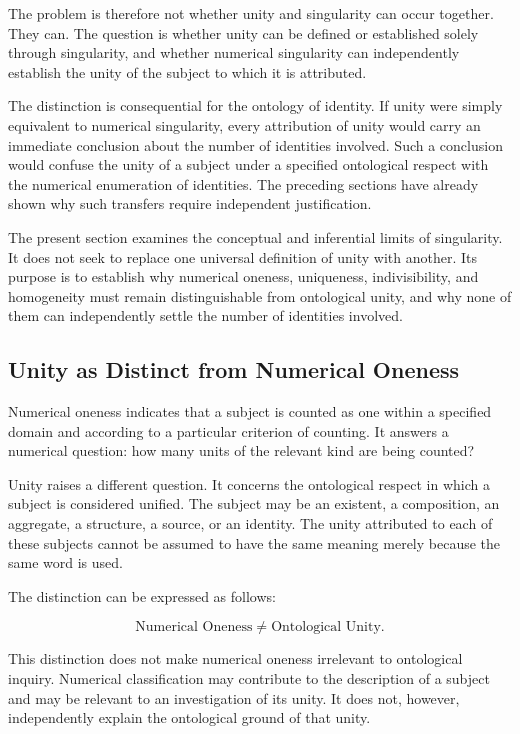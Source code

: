 The problem is therefore not whether unity and singularity
can occur together. They can. The question is whether
unity can be defined or established solely through
singularity, and whether numerical singularity can
independently establish the unity of the subject to
which it is attributed.

The distinction is consequential for the ontology
of identity. If unity were simply equivalent to
numerical singularity, every attribution of unity
would carry an immediate conclusion about the number
of identities involved. Such a conclusion would
confuse the unity of a subject under a specified
ontological respect with the numerical enumeration
of identities. The preceding sections have already
shown why such transfers require independent
justification.

The present section examines the conceptual and
inferential limits of singularity. It does not seek
to replace one universal definition of unity with
another. Its purpose is to establish why numerical
oneness, uniqueness, indivisibility, and homogeneity
must remain distinguishable from ontological unity,
and why none of them can independently settle
the number of identities involved.

\subsection{Unity as Distinct from Numerical Oneness}

Numerical oneness indicates that a subject is
counted as one within a specified domain and
according to a particular criterion of counting.
It answers a numerical question: how many units
of the relevant kind are being counted?

Unity raises a different question. It concerns
the ontological respect in which a subject is
considered unified. The subject may be an existent,
a composition, an aggregate, a structure, a source,
or an identity. The unity attributed to each
of these subjects cannot be assumed to have
the same meaning merely because the same word
is used.

The distinction can be expressed as follows:

\[
\text{Numerical Oneness}
\neq
\text{Ontological Unity}.
\]

This distinction does not make numerical oneness
irrelevant to ontological inquiry. Numerical
classification may contribute to the description
of a subject and may be relevant to an investigation
of its unity. It does not, however, independently
explain the ontological ground of that unity.

